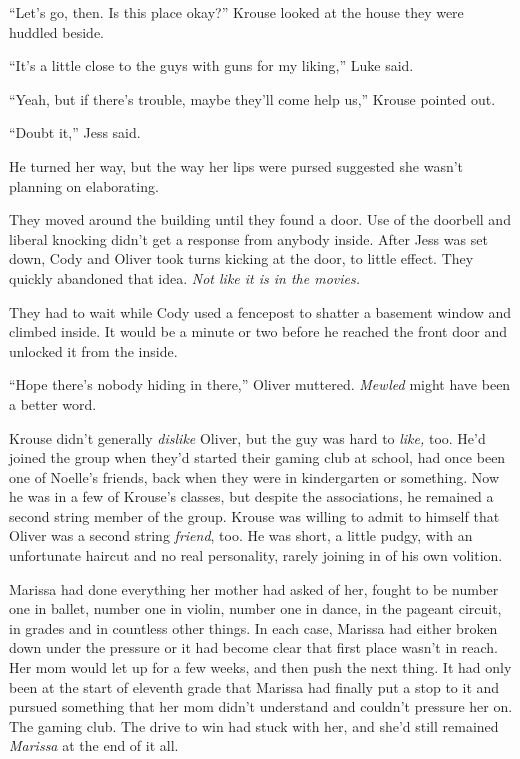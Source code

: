 ``Let's go, then.  Is this place okay?''  Krouse looked at the house they were huddled beside.



``It's a little close to the guys with guns for my liking,'' Luke said.



``Yeah, but if there's trouble, maybe they'll come help us,'' Krouse pointed out.



``Doubt it,'' Jess said.



He turned her way, but the way her lips were pursed suggested she wasn't planning on elaborating.



They moved around the building until they found a door.  Use of the doorbell and liberal knocking didn't get a response from anybody inside.  After Jess was set down, Cody and Oliver took turns kicking at the door, to little effect.  They quickly abandoned that idea.  \emph{Not like it is in the movies.}



They had to wait while Cody used a fencepost to shatter a basement window and climbed inside.  It would be a minute or two before he reached the front door and unlocked it from the inside.



``Hope there's nobody hiding in there,'' Oliver muttered.  \emph{Mewled} might have been a better word.



Krouse didn't generally \emph{dislike} Oliver, but the guy was hard to \emph{like, }too.  He'd joined the group when they'd started their gaming club at school, had once been one of Noelle's friends, back when they were in kindergarten or something.  Now he was in a few of Krouse's classes, but despite the associations, he remained a second string member of the group.  Krouse was willing to admit to himself that Oliver was a second string \emph{friend}, too.  He was short, a little pudgy, with an unfortunate haircut and no real personality, rarely joining in of his own volition.



Marissa had done everything her mother had asked of her, fought to be number one in ballet, number one in violin, number one in dance, in the pageant circuit, in grades and in countless other things.  In each case, Marissa had either broken down under the pressure or it had become clear that first place wasn't in reach.  Her mom would let up for a few weeks, and then push the next thing.  It had only been at the start of eleventh grade that Marissa had finally put a stop to it and pursued something that her mom didn't understand and couldn't pressure her on.  The gaming club.  The drive to win had stuck with her, and she'd still remained \emph{Marissa} at the end of it all.



